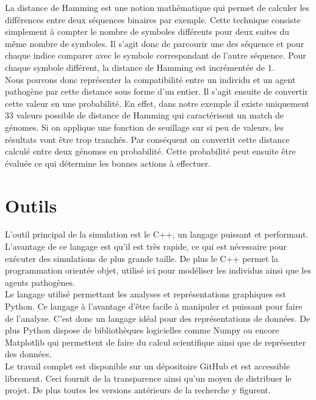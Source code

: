 La distance de Hamming est une notion mathématique qui permet de calculer les différences entre deux séquences binaires par exemple. Cette technique consiste simplement à compter le nombre de symboles différents pour deux suites du même nombre de symboles. Il s'agit donc de parcourir une des séquence et pour chaque indice comparer avec le symbole correspondant de l'autre séquence. Pour chaque symbole différent, la distance de Hamming est incrémentée de $1$.\\

Nous pouvons donc représenter la compatibilité entre un individu et un agent pathogène par cette distance sous forme d'un entier. Il s'agit ensuite de convertir cette valeur en une probabilité. En effet, dans notre exemple il existe uniquement $33$ valeurs possible de distance de Hamming qui caractérisent un match de génomes. Si on applique une fonction de seuillage sur si peu de valeurs, les résultats vont être trop tranchés. Par conséquent on convertit cette distance calculé entre deux génomes en probabilité. Cette probabilité peut ensuite être évaluée ce qui détermine les bonnes actions à effectuer.\\

\section{Outils}
L'outil principal de la simulation est le C++, un langage puissant et performant. L'avantage de ce langage est qu'il est très rapide, ce qui est nécessaire pour exécuter des simulations de plus grande taille. De plus le C++ permet la programmation orientée objet, utilisé ici pour modéliser les individus ainsi que les agents pathogènes.\\

Le langage utilisé permettant les analyses et représentations graphiques est Python. Ce langage à l'avantage d'être facile à manipuler et puissant pour faire de l'analyse. C'est donc un langage idéal pour des représentations de données. De plus Python dispose de bibliothèques logicielles comme Numpy ou encore Matplotlib qui permettent de faire du calcul scientifique ainsi que de représenter des données.\\

Le travail complet est disponible sur un dépositoire GitHub et est accessible librement. Ceci fournit de la transparence ainsi qu'un moyen de distribuer le projet. De plus toutes les versions antérieurs de la recherche y figurent.
